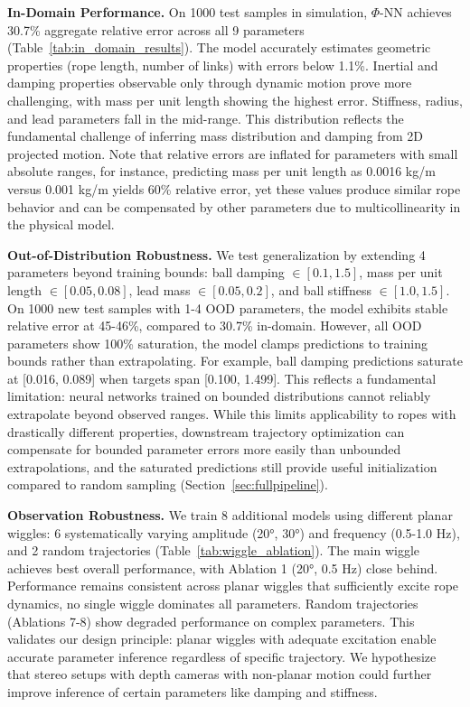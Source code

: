 \documentclass[conference]{IEEEtran}
\begin{document}
\textbf{In-Domain Performance.} On 1000 test samples in simulation, $\Phi$-NN achieves 30.7\% aggregate relative error across all 9 parameters (Table~\ref{tab:in_domain_results}). The model accurately estimates geometric properties (rope length, number of links) with errors below 1.1\%. Inertial and damping properties observable only through dynamic motion prove more challenging, with mass per unit length showing the highest error. Stiffness, radius, and lead parameters fall in the mid-range. This distribution reflects the fundamental challenge of inferring mass distribution and damping from 2D projected motion. Note that relative errors are inflated for parameters with small absolute ranges, for instance, predicting mass per unit length as 0.0016 kg/m versus 0.001 kg/m yields 60\% relative error, yet these values produce similar rope behavior and can be compensated by other parameters due to multicollinearity in the physical model.


\textbf{Out-of-Distribution Robustness.} We test generalization by extending 4 parameters beyond training bounds: ball damping $\in [0.1, 1.5]$, mass per unit length $\in [0.05, 0.08]$, lead mass $\in [0.05, 0.2]$, and ball stiffness $\in [1.0, 1.5]$. On 1000 new test samples with 1-4 OOD parameters, the model exhibits stable relative error at 45-46\%, compared to 30.7\% in-domain. However, all OOD parameters show 100\% saturation, the model clamps predictions to training bounds rather than extrapolating. For example, ball damping predictions saturate at [0.016, 0.089] when targets span [0.100, 1.499]. This reflects a fundamental limitation: neural networks trained on bounded distributions cannot reliably extrapolate beyond observed ranges. While this limits applicability to ropes with drastically different properties, downstream trajectory optimization can compensate for bounded parameter errors more easily than unbounded extrapolations, and the saturated predictions still provide useful initialization compared to random sampling (Section~\ref{sec:fullpipeline}).

\textbf{Observation Robustness.} \label{sec:wiggleablation}We train 8 additional models using different planar wiggles: 6 systematically varying amplitude (20°, 30°) and frequency (0.5-1.0 Hz), and 2 random trajectories (Table~\ref{tab:wiggle_ablation}). The main wiggle achieves best overall performance, with Ablation 1 (20°, 0.5 Hz) close behind. Performance remains consistent across planar wiggles that sufficiently excite rope dynamics, no single wiggle dominates all parameters. Random trajectories (Ablations 7-8) show degraded performance on complex parameters. This validates our design principle: planar wiggles with adequate excitation enable accurate parameter inference regardless of specific trajectory. We hypothesize that stereo setups with depth cameras with non-planar motion could further improve inference of certain parameters like damping and stiffness.
\end{document}
